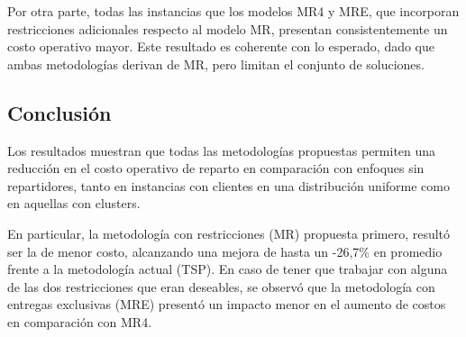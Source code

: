 \documentclass[10pt]{article}
\begin{document}
Por otra parte, todas las instancias que los modelos MR4 y MRE, que incorporan restricciones adicionales respecto al modelo MR, presentan consistentemente un costo operativo mayor. Este resultado es coherente con lo esperado, dado que ambas metodologías derivan de MR, pero limitan el conjunto de soluciones.

\subsection{Conclusión}
Los resultados muestran que todas las metodologías propuestas permiten una reducción en el costo operativo de reparto en comparación con enfoques sin repartidores, tanto en instancias con clientes en una distribución uniforme como en aquellas con clusters.

En particular, la metodología con restricciones (MR) propuesta primero, resultó ser la de menor costo, alcanzando una mejora de hasta un -26,7\% en promedio frente a la metodología actual (TSP). En caso de tener que trabajar con alguna de las dos restricciones que eran deseables, se observó que la metodología con entregas exclusivas (MRE) presentó un impacto menor en el aumento de costos en comparación con MR4.
\end{document}
